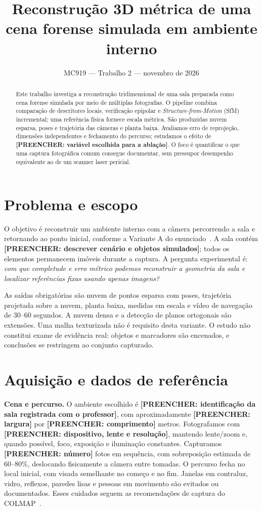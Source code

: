 \documentclass[10pt,a4paper]{article}
\title{Reconstrução 3D métrica de uma cena forense simulada em ambiente interno}
\author{\Resultado{integrantes e RAs do grupo}}
\date{MC919 --- Trabalho 2 --- novembro de 2026}
\newcommand{\Resultado}[1]{\textcolor{red!65!black}{\textbf{[PREENCHER: #1]}}}
\begin{document}
\maketitle
\vspace{-1.4em}

\begin{abstract}
Este trabalho investiga a reconstrução tridimensional de uma sala preparada como cena forense simulada por meio de múltiplas fotografias. O pipeline combina comparação de descritores locais, verificação epipolar e \emph{Structure-from-Motion} (SfM) incremental; uma referência física fornece escala métrica. São produzidas nuvem esparsa, poses e trajetória das câmeras e planta baixa. Avaliamos erro de reprojeção, dimensões independentes e fechamento do percurso; estudamos o efeito de \Resultado{variável escolhida para a ablação}. O foco é quantificar o que uma captura fotográfica comum consegue documentar, sem pressupor desempenho equivalente ao de um scanner laser pericial.
\end{abstract}

\section{Problema e escopo}
O objetivo é reconstruir um ambiente interno com a câmera percorrendo a sala e retornando ao ponto inicial, conforme a Variante A do enunciado~\cite{enunciado}. A sala contém \Resultado{descrever cenário e objetos simulados}; todos os elementos permanecem imóveis durante a captura. A pergunta experimental é: \emph{com que completude e erro métrico podemos reconstruir a geometria da sala e localizar referências fixas usando apenas imagens?}

As saídas obrigatórias são nuvem de pontos esparsa com poses, trajetória projetada sobre a nuvem, planta baixa, medidas em escala e vídeo de navegação de 30--60 segundos. A nuvem densa e a detecção de planos ortogonais são extensões. Uma malha texturizada não é requisito desta variante. O estudo não constitui exame de evidência real: objetos e marcadores são encenados, e conclusões se restringem ao conjunto capturado.

\section{Aquisição e dados de referência}
\textbf{Cena e percurso.} O ambiente escolhido é \Resultado{identificação da sala registrada com o professor}, com aproximadamente \Resultado{largura} por \Resultado{comprimento} metros. Fotografamos com \Resultado{dispositivo, lente e resolução}, mantendo lente/zoom e, quando possível, foco, exposição e iluminação constantes. Capturamos \Resultado{número} fotos em sequência, com sobreposição estimada de 60--80\%, deslocando fisicamente a câmera entre tomadas. O percurso fecha no local inicial, com visada semelhante no começo e no fim. Janelas em contraluz, vidro, reflexos, paredes lisas e pessoas em movimento são evitados ou documentados. Esses cuidados seguem as recomendações de captura do COLMAP~\cite{colmap}.
\end{document}
